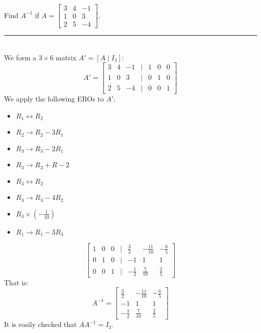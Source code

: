 \documentclass[a4paper, 9pt]{extarticle}
\begin{document}
\begin{examplebox}{}{}
  Find $A^{-1}$ if $A = \begin{bmatrix}
      3 & 4 & -1 \\
      1 & 0 & 3  \\
      2 & 5 & -4
    \end{bmatrix}$.
  \\[2ex] \rule{\textwidth}{1px} \\
  We form a $3 \times 6$ matrix $A' = [A \mid I_3]$:
  $$
    A' = \begin{bmatrix}
      3 & 4 & -1 & | & 1 & 0 & 0 \\
      1 & 0 & 3  & | & 0 & 1 & 0 \\
      2 & 5 & -4 & | & 0 & 0 & 1
    \end{bmatrix}
  $$
  We apply the following EROs to $A'$:
  \begin{itemize}
    \item $R_1 \leftrightarrow R_2$
    \item $R_2 \rightarrow R_2 - 3R_1$
    \item $R_3 \rightarrow R_3 - 2R_1$
    \item $R_3 \rightarrow R_3 + R-2$
    \item $R_3 \leftrightarrow R_2$
    \item $R_3 \rightarrow R_3 - 4R_2$
    \item $R_3 \times (-\frac{1}{10})$
    \item $R_1 \rightarrow R_1 - 3R_3$
  \end{itemize}
  $$
    \begin{bmatrix}
      1 & 0 & 0 & | & \frac{3}{2}  & -\frac{11}{10} & -\frac{6}{5} \\
      0 & 1 & 0 & | & -1           & 1              & 1            \\
      0 & 0 & 1 & | & -\frac{1}{2} & \frac{7}{10}   & \frac{2}{5}
    \end{bmatrix}
  $$
  That is:
  $$A^{-1} = \begin{bmatrix}
      \frac{3}{2}  & -\frac{11}{10} & -\frac{6}{5} \\
      -1           & 1              & 1            \\
      -\frac{1}{2} & \frac{7}{10}   & \frac{2}{5}
    \end{bmatrix}$$
  It is easily checked that $AA^{-1} = I_3$.
\end{examplebox}
\end{document}
